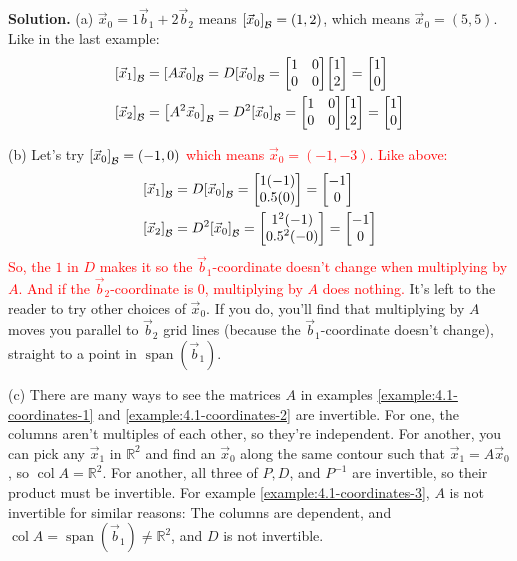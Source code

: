 \documentclass[11pt, letterpaper]{report}
\newenvironment{book}{}{}
\let\originalleft\left
\let\originalright\right
\renewcommand{\left}{\mathopen{}\mathclose\bgroup\originalleft}
\renewcommand{\right}{\aftergroup\egroup\originalright}
\newcounter{example}[section]
\newcommand{\R}{\mathbb{R}}
\DeclareMathOperator{\col}{col}
\DeclareMathOperator{\spn}{span}
\newcommand{\bbvec}[2]{
  \begin{bmatrix} #1 \\ #2 \end{bmatrix}
}
\newcommand{\vectorgrid}[1][]{%
  \pgfkeys{/vectorgrid/.cd, #1}%
  \clip (\vgxmin,\vgymin) rectangle (\vgxmax,\vgymax);

  \draw[step=\vgstep cm, gray, very thin] (\vgxmin,\vgymin) grid (\vgxmax,\vgymax);

  \draw[-] (\vgxmin,0) -- (\vgxmax,0);%
  \draw[-] (0,\vgymin) -- (0,\vgymax);%

  \pgfmathsetmacro{\bignum}{50}

  \foreach \k in {-20,...,20} {
    \pgfmathsetmacro{\px}{\k*\vgxv}
    \pgfmathsetmacro{\py}{\k*\vgyv}
    \pgfmathparse{abs(\px) <= abs(\vgxmax)*2+abs(\vgxmin)*2 && abs(\py) <= abs(\vgymax)*2+abs(\vgymin)*2 ? 1 : 0}
    \ifnum\pgfmathresult=1
      \draw[blue, very thin] ($(\px,\py) - \bignum*(\vgxu,\vgyu)$) -- ($(\px,\py) + \bignum*(\vgxu,\vgyu)$);
    \fi
  }

  \foreach \k in {-20,...,20} {
    \pgfmathsetmacro{\px}{\k*\vgxu}
    \pgfmathsetmacro{\py}{\k*\vgyu}
    \pgfmathparse{abs(\px) <= abs(\vgxmax)*2+abs(\vgxmin)*2 && abs(\py) <= abs(\vgymax)*2+abs(\vgymin)*2 ? 1 : 0}
    \ifnum\pgfmathresult=1
      \draw[blue, very thin] ($(\px,\py) - \bignum*(\vgxv,\vgyv)$) -- ($(\px,\py) + \bignum*(\vgxv,\vgyv)$);
    \fi
  }

  \draw[-Stealth, very thick, blue] (0,0) -- (\vgxu,\vgyu);%
  \draw[-Stealth, very thick, blue] (0,0) -- (\vgxv,\vgyv);%

  \pgfmathtruncatemacro{\intxmin}{ceil(\vgxmin)}
  \pgfmathtruncatemacro{\intxmax}{floor(\vgxmax)}
  \foreach \x in {\intxmin,...,\intxmax} {
    \pgfmathparse{mod(\x,\vglabint) == 0 && \x != 0 && \x != \vgxmin && \x != \vgxmax ? 1 : 0}
    \ifnum\pgfmathresult=1
      \draw (\x,0.1) -- (\x,-0.1) node[anchor=north,fill=white,inner sep=1pt] {\small$\x$};
    \fi
  }

  \pgfmathtruncatemacro{\intymin}{ceil(\vgymin)}
  \pgfmathtruncatemacro{\intymax}{floor(\vgymax)}
  \foreach \y in {\intymin,...,\intymax} {
    \pgfmathparse{mod(\y,\vglabint) == 0 && \y != 0 && \y != \vgymin && \y != \vgymax ? 1 : 0}
    \ifnum\pgfmathresult=1
      \draw (0.1,\y) -- (-0.1,\y) node[anchor=east,fill=white,inner sep=1pt] {\small$\y$};
    \fi
  }
}
\begin{document}
\begin{book}
\textbf{Solution.} (a) $\vec{x}_0=1\vec{b}_1+2\vec{b}_2$ means $\left[ \vec{x}_0 \right]_{\mathcal{B}} = (1,2)$, which means $\vec{x}_0=(5,5)$. Like in the last example:
\begin{align*}
\left[ \vec{x}_1 \right]_{\mathcal{B}} &= \left[ A\vec{x}_0 \right]_{\mathcal{B}} =
D\left[ \vec{x}_0 \right]_{\mathcal{B}} = \begin{bmatrix}
1 & 0 \\
0 & 0
\end{bmatrix}\bbvec{1}{2} = \bbvec{1}{0} \\
\left[ \vec{x}_2 \right]_{\mathcal{B}} &= \left[ A^2\vec{x}_0 \right]_{\mathcal{B}} =
D^2\left[ \vec{x}_0 \right]_{\mathcal{B}} = \begin{bmatrix}
1 & 0 \\
0 & 0
\end{bmatrix}\bbvec{1}{2} = \bbvec{1}{0}
\end{align*}

(b) Let's try \textcolor{red}{$\left[ \vec{x}_0 \right]_{\mathcal{B}} = (-1,0)$ which means $\vec{x}_0=(-1,-3).$ Like above:
\begin{align*}
\left[ \vec{x}_1 \right]_{\mathcal{B}} &= 
D\left[ \vec{x}_0 \right]_{\mathcal{B}} = \bbvec{1(-1)}{0.5(0)} = \bbvec{-1}{0} \\
\left[ \vec{x}_2 \right]_{\mathcal{B}} &= 
D^2\left[ \vec{x}_0 \right]_{\mathcal{B}} = \bbvec{1^2(-1)}{0.5^2(-0)} = \bbvec{-1}{0}
\end{align*}
So, the $1$ in $D$ makes it so the $\vec{b}_1$-coordinate doesn't change when multiplying by $A$. And if the $\vec{b}_2$-coordinate is 0, multiplying by $A$ does nothing.}
It's left to the reader to try other choices of $\vec{x}_0$. If you do, you'll find that multiplying by $A$ moves you parallel to $\vec{b}_2$ grid lines (because the $\vec{b}_1$-coordinate doesn't change), straight to a point in $\spn ( \vec{b}_1 )$.


(c) There are many ways to see the matrices $A$ in examples \ref{example:4.1-coordinates-1} and \ref{example:4.1-coordinates-2} are invertible. For one, the columns aren't multiples of each other, so they're independent. For another, you can pick any $\vec{x}_1$ in $\R^2$ and find an $\vec{x}_0$ along the same contour such that $\vec{x}_1=A\vec{x}_0$, so $\col A = \R^2$. For another, all three of $P, D$, and $P^{-1}$ are invertible, so their product must be invertible. For example \ref{example:4.1-coordinates-3}, $A$ is not invertible for similar reasons: The columns are dependent, and $\col A = \spn (\vec{b}_1) \ne \R^2$, and $D$ is not invertible.
\end{book}
\end{document}
